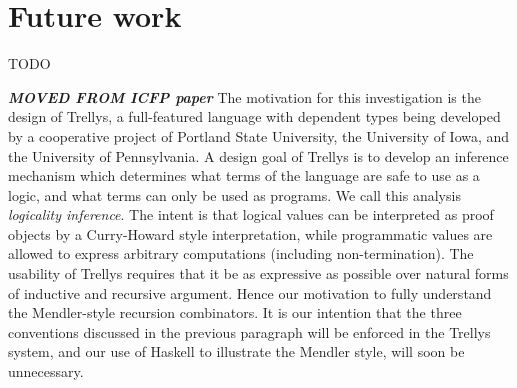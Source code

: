 \chapter{Future work}\label{ch:futwork} TODO

{\bf {\it MOVED FROM ICFP paper}}
The motivation for this investigation is the design of Trellys, a
full-featured language with dependent types being developed by a
cooperative project of Portland State University, the University of Iowa,
and the University of Pennsylvania. A design goal of Trellys is to develop
an inference mechanism which determines what terms of the language are safe
to use as a logic, and what terms can only be used as programs. We call
this analysis {\em logicality inference}. The intent is that logical values
can be interpreted as proof objects by a Curry-Howard style interpretation,
while programmatic values are allowed to express arbitrary computations
(including non-termination). The usability of Trellys requires that it be
as expressive as possible over natural forms of inductive and recursive
argument.  Hence our motivation to fully understand the Mendler-style
recursion combinators. It is our intention that the three conventions
discussed in the previous paragraph will be enforced in the Trellys system, and
our use of Haskell to illustrate the Mendler style, will soon be unnecessary.

